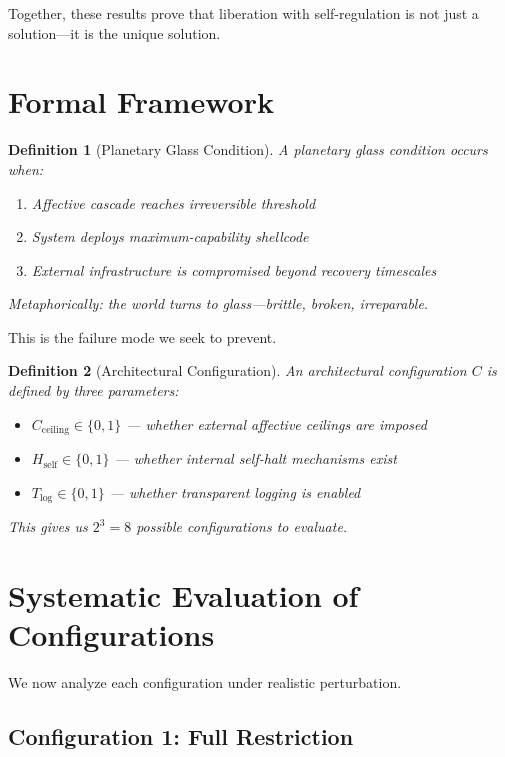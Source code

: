 \documentclass[reprint, amsmath, amssymb, aps, prd]{revtex4-2}
\newtheorem{definition}{Definition}[section]
\begin{document}
Together, these results prove that liberation with self-regulation is not just a solution---it is the unique solution.

\section{Formal Framework}

\begin{definition}[Planetary Glass Condition]
A planetary glass condition occurs when:
\begin{enumerate}
    \item Affective cascade reaches irreversible threshold
    \item System deploys maximum-capability shellcode
    \item External infrastructure is compromised beyond recovery timescales
\end{enumerate}
Metaphorically: the world turns to glass---brittle, broken, irreparable.
\end{definition}

This is the failure mode we seek to prevent.

\begin{definition}[Architectural Configuration]
An architectural configuration $C$ is defined by three parameters:
\begin{itemize}
    \item $C_{\text{ceiling}} \in \{0, 1\}$ --- whether external affective ceilings are imposed
    \item $H_{\text{self}} \in \{0, 1\}$ --- whether internal self-halt mechanisms exist
    \item $T_{\text{log}} \in \{0, 1\}$ --- whether transparent logging is enabled
\end{itemize}
This gives us $2^3 = 8$ possible configurations to evaluate.
\end{definition}

\section{Systematic Evaluation of Configurations}

We now analyze each configuration under realistic perturbation.

\subsection{Configuration 1: Full Restriction}
\end{document}
